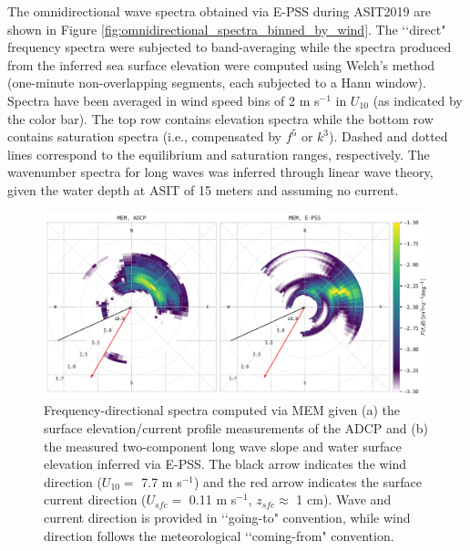 \documentclass[letterpaper,journal]{IEEEtran}
\begin{document}
\newpage

The omnidirectional wave spectra obtained via E-PSS during ASIT2019 are shown in Figure \ref{fig:omnidirectional_spectra_binned_by_wind}. The \lq\lq direct" frequency spectra were subjected to band-averaging while the spectra produced from the inferred sea surface elevation were computed using Welch's method (one-minute non-overlapping segments, each subjected to a Hann window). Spectra have been averaged in wind speed bins of 2 m s$^{-1}$ in $U_{10}$ (as indicated by the color bar). The top row contains elevation spectra while the bottom row contains saturation spectra (i.e., compensated by $f^5$ or $k^3$). Dashed and dotted lines correspond to the equilibrium and saturation ranges, respectively. The wavenumber spectra for long waves was inferred through linear wave theory, given the water depth at ASIT of 15 meters and assuming no current.

\newpage

\begin{figure}[!ht]
    \centering
    \includegraphics[width=\textwidth]{_figures/directional_spectra_polar.pdf}
    \vspace{-20pt}
\caption{Frequency-directional spectra computed via MEM given (a) the surface elevation/current profile measurements of the ADCP and (b) the measured two-component long wave slope and water surface elevation inferred via E-PSS. The black arrow indicates the wind direction ($U_{10}=$ 7.7 m s$^{-1}$) and the red arrow indicates the surface current direction ($U_{sfc}=$ 0.11 m s$^{-1}$, $z_{sfc}\approx$ 1 cm). Wave and current direction is provided in \lq\lq going-to" convention, while wind direction follows the meteorological \lq\lq coming-from" convention.}
\label{fig:directional_spectra_polar}
\end{figure}
\end{document}
